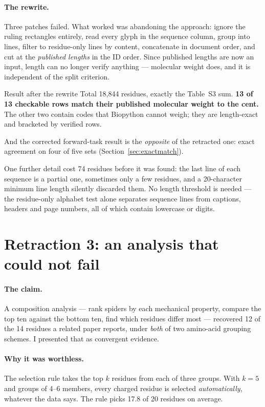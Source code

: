 \paragraph{The rewrite.} Three patches failed. What worked was abandoning the
approach: ignore the ruling rectangles entirely, read every glyph in the
sequence column, group into lines, filter to residue-only lines by content,
concatenate in document order, and cut at the \emph{published lengths} in the ID
order. Since published lengths are now an input, length can no longer verify
anything --- molecular weight does, and it is independent of the split criterion.

\begin{goodbox}{Result after the rewrite}
Total 18{,}844 residues, exactly the Table~S3 sum. \textbf{13 of 13 checkable
rows match their published molecular weight to the cent.} The other two contain
 codes that Biopython cannot weigh; they are length-exact and bracketed
by verified rows.

And the corrected forward-task result is the \emph{opposite} of the retracted
one: exact agreement on four of five sets (Section~\ref{sec:exactmatch}).
\end{goodbox}

One further detail cost 74 residues before it was found: the last line of each
sequence is a partial one, sometimes only a few residues, and a 20-character
minimum line length silently discarded them. No length threshold is needed --- the
residue-only alphabet test alone separates sequence lines from captions,
headers and page numbers, all of which contain lowercase or digits.

\section{Retraction 3: an analysis that could not fail}
\label{sec:nullretraction}

\paragraph{The claim.} A composition analysis --- rank spiders by each mechanical
property, compare the top ten against the bottom ten, find which residues differ
most --- recovered 12 of the 14 residues a related paper reports, under
\emph{both} of two amino-acid grouping schemes. I presented that as convergent
evidence.

\paragraph{Why it was worthless.} The selection rule takes the top $k$ residues
from each of three groups. With $k = 5$ and groups of 4--6 members, every
charged residue is selected \emph{automatically}, whatever the data says. The
rule picks 17.8 of 20 residues on average.


